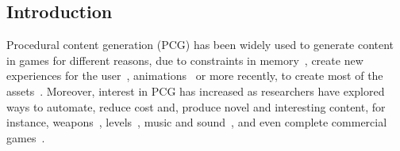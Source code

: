\subsection{Introduction} \label{p2introduction}


Procedural content generation (PCG) has been widely used to generate content in games for different reasons, due to constraints in memory~, create new experiences for the user~, animations~ or more recently, to create most of the assets~. Moreover, interest in PCG has increased as researchers have explored ways to automate, reduce cost and, produce novel and interesting content, for instance, weapons~, levels~, music and sound~, and even complete commercial games~.

